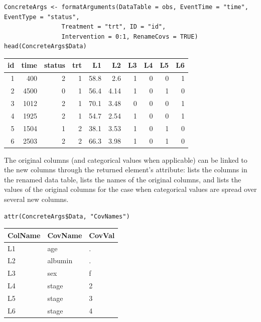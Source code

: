\documentclass{report}
\newcommand{\1}{\ensuremath{\mathbf{1}}}
\begin{document}
\begin{lstlisting}
ConcreteArgs <- formatArguments(DataTable = obs, EventTime = "time", EventType = "status", 
				Treatment = "trt", ID = "id",
				Intervention = 0:1, RenameCovs = TRUE)
head(ConcreteArgs$Data)
\end{lstlisting}

\begin{center}
\begin{tabular}{rrrrrrrrrr}
id & time & status & trt & L1 & L2 & L3 & L4 & L5 & L6\\
\hline
1 & 400 & 2 & 1 & 58.8 & 2.6 & 1 & 0 & 0 & 1\\
2 & 4500 & 0 & 1 & 56.4 & 4.14 & 1 & 0 & 1 & 0\\
3 & 1012 & 2 & 1 & 70.1 & 3.48 & 0 & 0 & 0 & 1\\
4 & 1925 & 2 & 1 & 54.7 & 2.54 & 1 & 0 & 0 & 1\\
5 & 1504 & 1 & 2 & 38.1 & 3.53 & 1 & 0 & 1 & 0\\
6 & 2503 & 2 & 2 & 66.3 & 3.98 & 1 & 0 & 1 & 0\\
\end{tabular}
\end{center}


The original columns (and categorical values when applicable) can be linked to the new columns through the returned  element's  attribute:  lists the columns in the renamed data table,  lists the names of the original columns, and  lists the values of the original columns for the case when categorical values are spread over several new columns.   

\begin{lstlisting}
attr(ConcreteArgs$Data, "CovNames")
\end{lstlisting}

\begin{center}
\begin{tabular}{lll}
ColName & CovName & CovVal\\
\hline
L1 & age & .\\
L2 & albumin & .\\
L3 & sex & f\\
L4 & stage & 2\\
L5 & stage & 3\\
L6 & stage & 4\\
\end{tabular}
\end{center}
\end{document}
